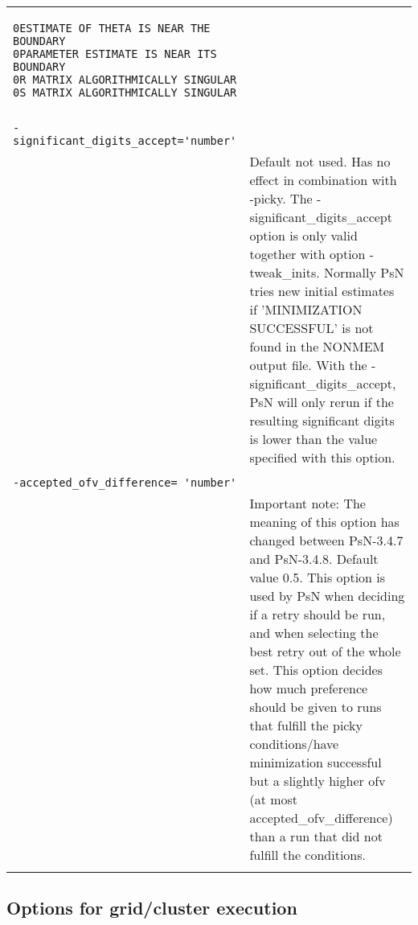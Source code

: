 \documentclass[a4paper,12pt]{article}
\begin{document}
\begin{longtable}{p{1in}p{4in}}
\begin{verbatim}
0ESTIMATE OF THETA IS NEAR THE BOUNDARY
0PARAMETER ESTIMATE IS NEAR ITS BOUNDARY
0R MATRIX ALGORITHMICALLY SINGULAR
0S MATRIX ALGORITHMICALLY SINGULAR
\end{verbatim}
\\
\\
\verb|-significant_digits_accept='number'| & \\
\nopagebreak
 & Default not used. Has no effect in combination with -picky. The -significant\_digits\_accept option is only valid together with option -tweak\_inits. Normally PsN tries new initial estimates if 'MINIMIZATION SUCCESSFUL' is not found in the NONMEM output file. With the -significant\_digits\_accept, PsN will only rerun if the resulting significant digits is lower than the value specified with this option. \\
\\
\verb|-accepted_ofv_difference= 'number'| & \\
\nopagebreak
 & Important note: The meaning of this option has changed between PsN-3.4.7 and PsN-3.4.8. Default value 0.5. This option is used by PsN when deciding if a retry should be run, and when selecting the best retry out of the whole set. This option decides how much preference should be given to runs that fulfill the picky conditions/have minimization successful but a slightly higher ofv (at most accepted\_ofv\_difference) than a run that did not fulfill the conditions.  \\
\\
\end{longtable}

\subsection{Options for grid/cluster execution}
\end{document}
